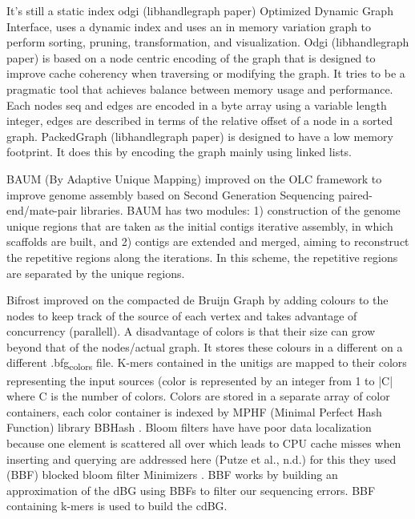 \documentclass[11pt]{article}
\begin{document}
It’s still a static index odgi (libhandlegraph paper)
Optimized Dynamic Graph Interface, uses a dynamic index and uses an in memory
variation graph to perform sorting, pruning, transformation, and visualization.
Odgi (libhandlegraph paper) is based on a node centric encoding of the graph that 
is designed to improve cache coherency when traversing or modifying the graph. 
It tries to be a pragmatic tool that achieves balance between memory usage and
performance. Each nodes seq and edges are encoded in a byte array using a 
variable length integer, edges are described in terms of the relative offset of 
a node in a sorted graph. PackedGraph (libhandlegraph paper) is designed to have
a low memory footprint. 
It does this by encoding the graph mainly using linked lists.

BAUM (By Adaptive Unique Mapping) \cite{wangBAUMImprovingGenome2018} improved on
the OLC framework to improve genome assembly based on Second Generation Sequencing
paired-end/mate-pair libraries.
BAUM has two modules: 1) construction of the genome unique regions that are taken
as the initial contigs iterative assembly, in which scaffolds are built, and 2)
contigs are extended and merged, aiming to reconstruct the repetitive regions 
along the iterations.
In this scheme, the repetitive regions are separated by the unique regions.

Bifrost \cite{holleyBifrostHighlyParallel2019} improved on the compacted de Bruijn
Graph by adding colours to the nodes to keep track of the source of each vertex 
and takes advantage of concurrency (parallell).
A disadvantage of colors is that their size can grow beyond that of the
nodes/actual graph. It stores these colours in a different on a different
.bfg\textsubscript{colors} file.
K-mers contained in the unitigs are mapped to their colors representing the
input sources (color is represented by an integer from 1 to |C| where C is the
number of colors. Colors are stored in a separate array of color containers,
each color container is indexed by MPHF (Minimal Perfect Hash Function) library
BBHash \cite{limassetFastScalableMinimal2017}.
Bloom filters have have poor data localization because one element is scattered
all over which leads to CPU cache misses when inserting and querying are
addressed here  (Putze et al., n.d.) for this they used (BBF) blocked bloom filter 
Minimizers \cite{robertsReducingStorageRequirements2004,grabowskiDiskbasedCompressionData2015}.
BBF works by building an approximation of the dBG using BBFs to filter our
sequencing errors.  BBF containing k-mers is used to build the cdBG.
\end{document}
